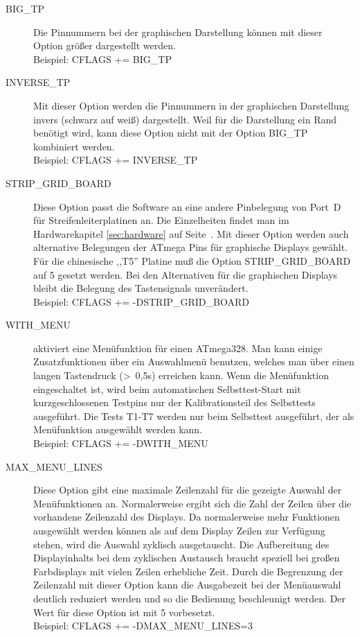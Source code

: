 \begin{description}
 \item[BIG\_TP] Die Pinnummern bei der graphischen Darstellung können mit dieser Option größer dargestellt werden.\\
Beispiel: CFLAGS += BIG\_TP

 \item[INVERSE\_TP] Mit dieser Option werden die Pinnummern in der graphischen Darstellung invers (schwarz auf weiß) dargestellt.
Weil für die Darstellung ein Rand benötigt wird, kann diese Option nicht mit der Option BIG\_TP kombiniert werden.\\
Beispiel: CFLAGS += INVERSE\_TP

  \item[STRIP\_GRID\_BOARD] Diese Option passt die Software an eine andere Pinbelegung von Port~D für Streifenleiterplatinen an.
Die Einzelheiten findet man im Hardwarekapitel \ref{sec:hardware} auf Seite~\pageref{sec:hardware}.
Mit dieser Option werden auch alternative Belegungen der ATmega Pins für graphische Displays gewählt.
Für die chinesische ,,T5'' Platine muß die Option STRIP\_GRID\_BOARD auf 5 gesetzt werden.
Bei den Alternativen für die graphischen Displays bleibt die Belegung  des Tastensignals unverändert.\\
Beispiel: CFLAGS += -DSTRIP\_GRID\_BOARD

  \item[WITH\_MENU] aktiviert eine Menüfunktion für einen ATmega328. Man kann einige Zusatzfunktionen über ein
Auswahlmenü benutzen, welches man über einen langen Tastendruck (\textgreater~0,5s) erreichen kann.
Wenn die Menüfunktion eingeschaltet ist, wird beim automatischen Selbsttest-Start mit kurzgeschlossenen Testpins
 nur der Kalibrationsteil des Selbsttests ausgeführt.
Die Tests T1-T7 werden nur beim Selbsttest ausgeführt, der als Menüfunktion ausgewählt werden kann.\\
Beispiel: CFLAGS += -DWITH\_MENU

 \item[MAX\_MENU\_LINES]
Diese Option gibt eine maximale Zeilenzahl für die gezeigte Auswahl der Menüfunktionen an.
Normalerweise ergibt sich die Zahl der Zeilen über die vorhandene Zeilenzahl des Displays.
Da normalerweise mehr Funktionen ausgewählt werden können als auf dem Display Zeilen zur Verfügung stehen,
wird die Auswahl zyklisch ausgetauscht.
Die Aufbereitung des Displayinhalts bei dem zyklischen Austausch braucht speziell bei großen Farbdisplays
mit vielen Zeilen erhebliche Zeit.
Durch die Begrenzung der Zeilenzahl mit dieser Option kann die Ausgabezeit bei der Menüauswahl deutlich reduziert werden
und so die Bedienung beschleunigt werden.
Der Wert für diese Option ist mit 5 vorbesetzt.\\
Beispiel: CFLAGS += -DMAX\_MENU\_LINES=3


\end{description}
